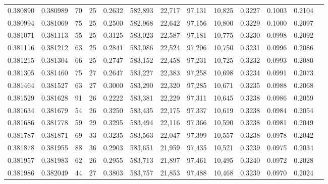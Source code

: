 \begin{tabular}{rrrrrrrrrrrrr}
0.380890 & 0.380989 &    70 &  25 &                                     0.2632 & 582,893 &  22,717 &  97,131 &  10,825 & 0.3227 & 0.1003 & 0.2104 \\
0.380994 & 0.381069 &    75 &  25 &                                     0.2500 & 582,968 &  22,642 &  97,156 &  10,800 & 0.3229 & 0.1000 & 0.2097 \\
0.381071 & 0.381113 &    55 &  25 &                                     0.3125 & 583,023 &  22,587 &  97,181 &  10,775 & 0.3230 & 0.0998 & 0.2092 \\
0.381116 & 0.381212 &    63 &  25 &                                     0.2841 & 583,086 &  22,524 &  97,206 &  10,750 & 0.3231 & 0.0996 & 0.2086 \\
0.381215 & 0.381304 &    66 &  25 &                                     0.2747 & 583,152 &  22,458 &  97,231 &  10,725 & 0.3232 & 0.0993 & 0.2080 \\
0.381305 & 0.381460 &    75 &  27 &                                     0.2647 & 583,227 &  22,383 &  97,258 &  10,698 & 0.3234 & 0.0991 & 0.2073 \\
0.381464 & 0.381527 &    63 &  27 &                                     0.3000 & 583,290 &  22,320 &  97,285 &  10,671 & 0.3235 & 0.0988 & 0.2068 \\
0.381529 & 0.381628 &    91 &  26 &                                     0.2222 & 583,381 &  22,229 &  97,311 &  10,645 & 0.3238 & 0.0986 & 0.2059 \\
0.381634 & 0.381679 &    54 &  26 &                                     0.3250 & 583,435 &  22,175 &  97,337 &  10,619 & 0.3238 & 0.0984 & 0.2054 \\
0.381686 & 0.381778 &    59 &  29 &                                     0.3295 & 583,494 &  22,116 &  97,366 &  10,590 & 0.3238 & 0.0981 & 0.2049 \\
0.381787 & 0.381871 &    69 &  33 &                                     0.3235 & 583,563 &  22,047 &  97,399 &  10,557 & 0.3238 & 0.0978 & 0.2042 \\
0.381878 & 0.381955 &    88 &  36 &                                     0.2903 & 583,651 &  21,959 &  97,435 &  10,521 & 0.3239 & 0.0975 & 0.2034 \\
0.381957 & 0.381983 &    62 &  26 &                                     0.2955 & 583,713 &  21,897 &  97,461 &  10,495 & 0.3240 & 0.0972 & 0.2028 \\
0.381986 & 0.382049 &    44 &  27 &                                     0.3803 & 583,757 &  21,853 &  97,488 &  10,468 & 0.3239 & 0.0970 & 0.2024 \\

\end{tabular}
